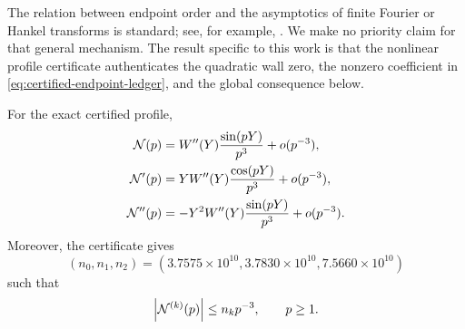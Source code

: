 The relation between endpoint order and the asymptotics of finite Fourier or
Hankel transforms is standard; see, for example,
\cite{wang2018,okadayamane2024}.  We make no priority claim for that general
mechanism.  The result specific to this work is that the nonlinear profile
certificate authenticates the quadratic wall zero, the nonzero coefficient in
\cref{eq:certified-endpoint-ledger}, and the global consequence below.

\begin{proposition}
\label{prop:sharp-transform-tail}
For the exact certified profile,
\begin{align}
 \mathcal N(p)
   &=W''(Y)\frac{\sin(pY)}{p^3}+o(p^{-3}),
 \notag\\
 \mathcal N'(p)
   &=Y W''(Y)\frac{\cos(pY)}{p^3}+o(p^{-3}),
 \notag\\
 \mathcal N''(p)
   &=-Y^2W''(Y)\frac{\sin(pY)}{p^3}+o(p^{-3}).
 \label{eq:sharp-p-minus-three-tail}
\end{align}
Moreover, the certificate gives
\begin{equation}
 (n_0,n_1,n_2)=
 (3.7575\!\times\!10^{10},
  3.7830\!\times\!10^{10},
  7.5660\!\times\!10^{10})
 \label{eq:inertia-transform-tail-constants}
\end{equation}
such that
\begin{equation}
 \left\lvert\mathcal N^{(k)}(p)\right\rvert\leq n_kp^{-3},
 \qquad p\geq1.
 \label{eq:global-inertia-transform-tail-bound}
\end{equation}
\end{proposition}

